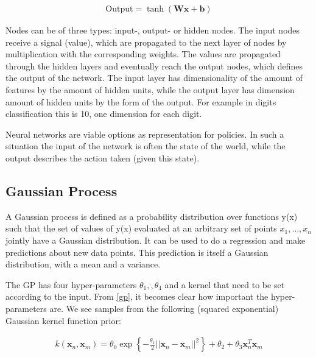\begin{align}
	\mbox{Output} = \tanh (\textbf{W} \textbf{x} + \textbf{b})
\end{align}

Nodes can be of three types: input-, output- or hidden nodes. The input nodes receive a signal (value), which are propagated to the next layer of nodes by multiplication with the corresponding weights. The values are propagated through the hidden layers and eventually reach the output nodes, which defines the output of the network. The input layer has dimensionality of the amount of features by the amount of hidden units, while the output layer has dimension amount of hidden units by the form of the output. For example in digits classification this is 10, one dimension for each digit.

Neural networks are viable options as representation for policies. In such a situation the input of the network is often the state of the world, while the output describes the action taken (given this state).

\subsection{Gaussian Process}
A Gaussian process is defined as a probability distribution over functions y(x) such that the set of values of y(x) evaluated at an arbitrary set of points $x_1, \dots, x_n$ jointly have a Gaussian distribution. \cite{bishop2006pattern} It can be used to do a regression and make predictions about new data points. This prediction is itself a Gaussian distribution, with a mean and a variance.

The GP has four hyper-parameters $\theta_1, \dot, \theta_4$ and a kernel that need to be set according to the input. From \ref{gp}, it becomes clear how important the hyper-parameters are. We see samples from the following (squared exponential) Gaussian kernel function prior:

\begin{align}
	k(\textbf{x}_n,\textbf{x}_m) = \theta_0 \exp \left \{ -\frac{\theta_1}{2} ||\textbf{x}_n-\textbf{x}_m ||^2 \right \} + \theta_2 + \theta_3\textbf{x}_n^T\textbf{x}_m
\end{align}

